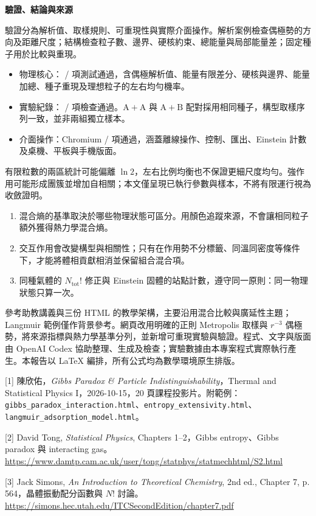 \documentclass[a4paper,10pt,fontset=none]{ctexart}
\newcommand{\pagetitle}[1]{%
  {\color{ink}\bfseries\fontsize{20}{26}\selectfont #1\par}\vspace{5pt}}
\newcommand{\topic}[1]{%
  \par\vspace{5pt}{\color{accent}\bfseries\fontsize{12}{17}\selectfont #1\par}\vspace{2pt}}
\newcommand{\smalltext}[1]{{\fontsize{9}{13.5}\selectfont\color{muted}#1\par}}
\newcommand{\ntot}{N_{\mathrm{tot}}}
\newcommand{\AB}{\mathrm A+\mathrm B}
\newcommand{\SameSpecies}{\mathrm A+\mathrm A}
\begin{document}
\newpage
\pagetitle{驗證、結論與來源}
\topic{驗證與範圍}
驗證分為解析值、取樣規則、可重現性與實際介面操作。解析案例檢查偶極勢的方向及距離尺度；結構檢查粒子數、邊界、硬核約束、總能量與局部能量差；固定種子用於比較與重現。
\begin{itemize}[leftmargin=1.3em,itemsep=2pt,topsep=3pt,parsep=0pt]
  \item 物理核心：\PhysicsPass{} / \PhysicsTotal{} 項測試通過，含偶極解析值、能量有限差分、硬核與邊界、能量加總、種子重現及理想粒子的左右均勻機率。
  \item 實驗紀錄：\ExperimentPass{} / \ExperimentTotal{} 項檢查通過。\(\SameSpecies\) 與 \(\AB\) 配對採用相同種子，構型取樣序列一致，並非兩組獨立樣本。
  \item 介面操作：Chromium \BrowserPass{} / \BrowserTotal{} 項通過，涵蓋離線操作、控制、匯出、Einstein 計數及桌機、平板與手機版面。
\end{itemize}
有限粒數的兩區統計可能偏離 \(\ln2\)，左右比例均衡也不保證更細尺度均勻。強作用可能形成團簇並增加自相關；本文僅呈現已執行參數與樣本，不將有限運行視為收斂證明。

\topic{學習結論}
\begin{enumerate}
  \item 混合熵的基準取決於哪些物理狀態可區分。用顏色追蹤來源，不會讓相同粒子額外獲得熱力學混合熵。
  \item 交互作用會改變構型與相關性；只有在作用勢不分標籤、同溫同密度等條件下，才能將體相貢獻相消並保留組合混合項。
  \item 同種氣體的 \(\ntot!\) 修正與 Einstein 固體的站點計數，遵守同一原則：同一物理狀態只算一次。
\end{enumerate}

\topic{參考範例與製作說明}
參考助教講義與三份 HTML 的教學架構，主要沿用混合比較與廣延性主題；Langmuir 範例僅作背景參考。網頁改用明確的正則 Metropolis 取樣與 \(r^{-3}\) 偶極勢，將來源指標與熱力學基準分列，並新增可重現實驗與驗證。程式、文字與版面由 OpenAI Codex 協助整理、生成及檢查；實驗數據由本專案程式實際執行產生。本報告以 LaTeX 編排，所有公式均為數學環境原生排版。

\topic{參考資料}
\smalltext{[1] 陳欣佑，\textit{Gibbs Paradox \& Particle Indistinguishability}，Thermal and Statistical Physics I，2026-10-15，20 頁課程投影片。附範例：\nolinkurl{gibbs_paradox_interaction.html}、\nolinkurl{entropy_extensivity.html}、\nolinkurl{langmuir_adsorption_model.html}。}
\smalltext{[2] David Tong, \textit{Statistical Physics}, Chapters 1--2，Gibbs entropy、Gibbs paradox 與 interacting gas。\\
\url{https://www.damtp.cam.ac.uk/user/tong/statphys/statmechhtml/S2.html}}
\smalltext{[3] Jack Simons, \textit{An Introduction to Theoretical Chemistry}, 2nd ed., Chapter 7, p.\,564，晶體振動配分函數與 \(N!\) 討論。\\
\url{https://simons.hec.utah.edu/ITCSecondEdition/chapter7.pdf}}
\end{document}
